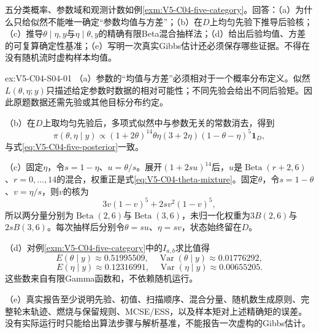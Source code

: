 \begin{SLChapterExercisePairSection}

\SLSourceBookExercises

\begin{exercise}\label{ex:V5-C04-S04-01}
五分类概率、参数域和观测计数如例\ref{exm:V5-C04-five-category}。回答：（a）为什么只给似然不能唯一确定“参数均值与方差”；（b）在$D$上均匀先验下推导后验核；（c）推导$\theta\mid\eta,y$与$\eta\mid\theta,y$的精确有限Beta混合抽样法；（d）给出后验均值、方差的可复算确定性基准；（e）写明一次真实Gibbs估计还必须保存哪些证据。不得在没有随机流时虚构样本均值。
\end{exercise}
\ifSLFullEdition
{}\label{sol:V5-C04-S04-01}
\begin{chapterexercisesolution}{ex:V5-C04-S04-01}
（a）参数的“均值与方差”必须相对于一个概率分布定义。似然$L(\theta,\eta;y)$只描述给定参数时数据的相对可能性；不同先验会给出不同后验矩。因此原题数据还需先验或其他目标分布约定。

（b）在$D$上取均匀先验后，多项式似然中与参数无关的常数消去，得到
\[
\pi(\theta,\eta\mid y)
\propto(1+2\theta)^{14}\theta\eta(3+2\eta)
(1-\theta-\eta)^5\mathbf1_D,
\]
与式\eqref{eq:V5-C04-five-posterior}一致。

（c）固定$\eta$，令$s=1-\eta$、$u=\theta/s$。展开$(1+2su)^{14}$后，$u$是$\operatorname{Beta}(r+2,6)$、$r=0,\ldots,14$的混合，权重正是式\eqref{eq:V5-C04-theta-mixture}。固定$\theta$，令$s=1-\theta$、$v=\eta/s$，则$v$的核为
\[
3v(1-v)^5+2s v^2(1-v)^5,
\]
所以两分量分别为$\operatorname{Beta}(2,6)$与$\operatorname{Beta}(3,6)$，未归一化权重为$3B(2,6)$与$2sB(3,6)$。每次抽样后分别令$\theta=su$、$\eta=sv$，状态始终留在$D$。

（d）对例\ref{exm:V5-C04-five-category}中的$I_{a,b}$求比值得
\[
E(\theta\mid y)\approx 0.51995509,
\quad \operatorname{Var}(\theta\mid y)\approx 0.01776292,
\]
\[
E(\eta\mid y)\approx 0.12316991,
\quad \operatorname{Var}(\eta\mid y)\approx 0.00655205.
\]
这些数来自有限Gamma函数和，不依赖随机运行。

（e）真实报告至少说明先验、初值、扫描顺序、混合分量、随机数生成原则、完整轮末轨迹、燃烧与保留规则、MCSE/ESS，以及样本矩对上述精确矩的误差。没有实际运行时只能给出算法步骤与解析基准，不能报告一次虚构的Gibbs估计。
\end{chapterexercisesolution}
\fi

\SLLectureSupplementExercises


\end{SLChapterExercisePairSection}
